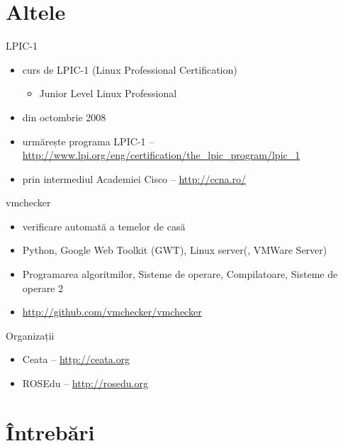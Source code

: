 \documentclass{beamer}
\begin{document}
\section{Altele}

\frame{\tableofcontents[currentsection]}

\begin{frame}{LPIC-1}
	\begin{itemize}
		\item curs de LPIC-1 (Linux Professional Certification)
			\begin{itemize}
				\item Junior Level Linux Professional
			\end{itemize}
		\item din octombrie 2008
		\item urmărește programa LPIC-1 --
		\url{http://www.lpi.org/eng/certification/the_lpic_program/lpic_1}
		\item prin intermediul Academiei Cisco -- \url{http://ccna.ro/}
	\end{itemize}
\end{frame}

\begin{frame}{vmchecker}
	\begin{itemize}
		\item verificare automată a temelor de casă
		\item Python, Google Web Toolkit (GWT), Linux server(, VMWare Server)
		\item Programarea algoritmilor, Sisteme de operare, Compilatoare,
		Sisteme de operare 2
		\item \url{http://github.com/vmchecker/vmchecker}
	\end{itemize}
\end{frame}

\begin{frame}{Organizații}
	\begin{itemize}
		\item Ceata -- \url{http://ceata.org}
		\item ROSEdu -- \url{http://rosedu.org}
	\end{itemize}
\end{frame}

\section{Întrebări}

\frame{\tableofcontents[currentsection]}
\end{document}
